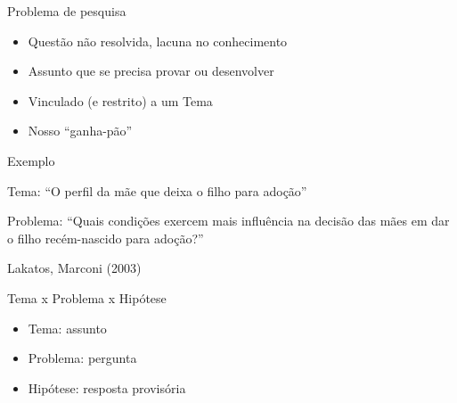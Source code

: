 \documentclass{beamer}
\begin{document}


\begin{frame}{Problema de pesquisa}
  \begin{itemize}
  \item Questão não resolvida, lacuna no conhecimento
  \item Assunto que se precisa provar ou desenvolver
  \item Vinculado (e restrito) a um Tema
  \item Nosso ``ganha-pão''
  \end{itemize}
\end{frame}

\begin{frame}{Exemplo}
  \begin{example}
    Tema: ``O perfil da mãe que deixa o filho para adoção''

    \bigskip

    Problema: ``Quais condições exercem mais influência na decisão das
    mães em dar o filho recém-nascido para adoção?''
  \end{example}
  Lakatos, Marconi (2003)
\end{frame}

\begin{frame}{Tema x Problema x Hipótese}
  \begin{itemize}
  \item Tema: assunto
  \item Problema: pergunta
  \item Hipótese: resposta provisória
  \end{itemize}
\end{frame}
\end{document}
